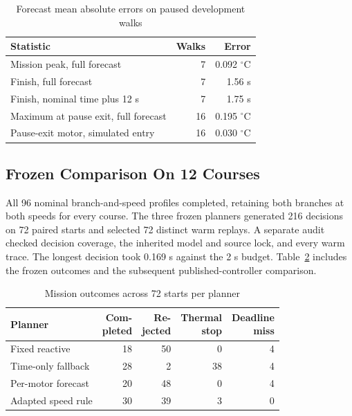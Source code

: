 \documentclass{ieeeaccess}
\begin{document}
\begin{table}[!t]
\caption{Forecast mean absolute errors on paused development walks}
\label{tab:development-errors}
\centering
\footnotesize
\setlength{\tabcolsep}{4pt}
\renewcommand{\arraystretch}{1.13}
\begin{tabularx}{\columnwidth}{@{}>{\raggedright\arraybackslash}Xrr@{}}
\hline
Statistic & Walks & Error \\
\hline
Mission peak, full forecast & 7 & 0.092 \ensuremath{{}^{\circ}\mathrm{C}} \\
Finish, full forecast & 7 & 1.56 s \\
Finish, nominal time plus 12 s & 7 & 1.75 s \\
Maximum at pause exit, full forecast & 16 & 0.195 \ensuremath{{}^{\circ}\mathrm{C}} \\
Pause-exit motor, simulated entry & 16 & 0.030 \ensuremath{{}^{\circ}\mathrm{C}} \\
\hline
\end{tabularx}
\end{table}

\subsection{Frozen Comparison On 12 Courses}

All 96 nominal branch-and-speed profiles completed, retaining both branches at both speeds for every course. The three frozen planners generated 216 decisions on 72 paired starts and selected 72 distinct warm replays. A separate audit checked decision coverage, the inherited model and source lock, and every warm trace. The longest decision took 0.169 s against the 2 s budget. Table~\ref{tab:outcomes} includes the frozen outcomes and the subsequent published-controller comparison.

\begin{table}[!t]
\caption{Mission outcomes across 72 starts per planner}
\label{tab:outcomes}
\centering
\footnotesize
\setlength{\tabcolsep}{4pt}
\renewcommand{\arraystretch}{1.18}
\begin{tabular}{@{}lrrrr@{}}
\hline
Planner & \shortstack{Com-\\pleted} & \shortstack{Re-\\jected} & \shortstack{Thermal\\stop} & \shortstack{Deadline\\miss} \\
\hline
Fixed reactive & 18 & 50 & 0 & 4 \\
Time-only fallback & 28 & 2 & 38 & 4 \\
Per-motor forecast & 20 & 48 & 0 & 4 \\
Adapted speed rule & 30 & 39 & 3 & 0 \\
\hline
\end{tabular}
\end{table}
\end{document}
